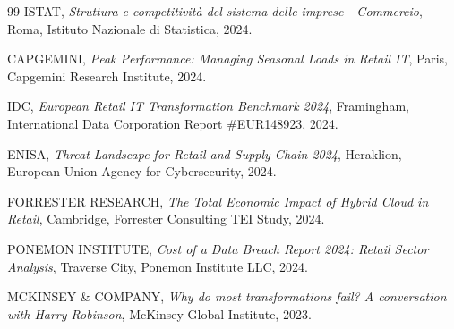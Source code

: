 \begin{thebibliography}{99}
 ISTAT, \textit{Struttura e competitività del sistema delle imprese - Commercio}, Roma, Istituto Nazionale di Statistica, 2024.

 CAPGEMINI, \textit{Peak Performance: Managing Seasonal Loads in Retail IT}, Paris, Capgemini Research Institute, 2024.

 IDC, \textit{European Retail IT Transformation Benchmark 2024}, Framingham, International Data Corporation Report \#EUR148923, 2024.

 ENISA, \textit{Threat Landscape for Retail and Supply Chain 2024}, Heraklion, European Union Agency for Cybersecurity, 2024.

 FORRESTER RESEARCH, \textit{The Total Economic Impact of Hybrid Cloud in Retail}, Cambridge, Forrester Consulting TEI Study, 2024.

 PONEMON INSTITUTE, \textit{Cost of a Data Breach Report 2024: Retail Sector Analysis}, Traverse City, Ponemon Institute LLC, 2024.

 MCKINSEY \& COMPANY, \textit{Why do most transformations fail? A conversation with Harry Robinson}, McKinsey Global Institute, 2023.
\end{thebibliography}